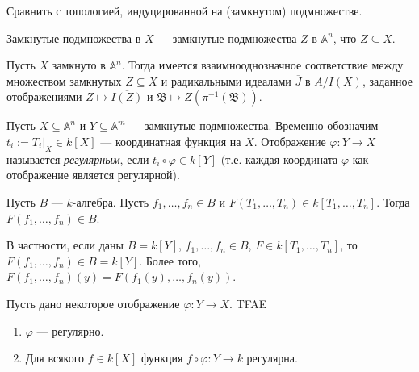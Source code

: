 \documentclass[12pt,a4paper]{article}
\renewcommand{\AA}{\ensuremath{\mathbb{A}}\xspace}
\begin{document}
    \begin{remark*}
        Сравнить с топологией, индуцированной на (замкнутом) подмножестве.
    \end{remark*}

    \begin{remark*}
        Замкнутые подмножества в $X$ --- замкнутые подмножества $Z$ в $\AA^n$, что $Z \subseteq X$.
    \end{remark*}

    \begin{corollary}
        Пусть $X$ замкнуто в $\AA^n$. Тогда имеется взаимнооднозначное соответствие между множеством замкнутых $Z \subseteq X$ и радикальными идеалами $\overline{J}$ в $A/I(X)$, заданное отображениями $Z \mapsto \overline{I(Z)}$ и $\mathfrak{B} \mapsto Z(\pi^{-1}(\mathfrak{B}))$.
    \end{corollary}

    \begin{definition}
        Пусть $X \subseteq \AA^n$ и $Y \subseteq \AA^m$ --- замкнутые подмножества. Временно обозначим $t_i := T_i|_X \in k[X]$ --- координатная функция на $X$. Отображение $\varphi: Y \to X$ называется \emph{регулярным}, если $t_i \circ \varphi \in k[Y]$ (т.е. каждая координата $\varphi$ как отображение является регулярной).
    \end{definition}

    \begin{remark}
        Пусть $B$ --- $k$-алгебра. Пусть $f_1, \dots, f_n \in B$ и $F(T_1, \dots, T_n) \in k[T_1, \dots, T_n]$. Тогда $F(f_1, \dots, f_n) \in B$.

        В частности, если даны $B = k[Y]$, $f_1, \dots, f_n \in B$, $F \in k[T_1, \dots, T_n]$, то $F(f_1, \dots, f_n) \in B = k[Y]$. Более того, $F(f_1, \dots, f_n)(y) = F(f_1(y), \dots, f_n(y))$.
    \end{remark}

    \begin{lemma}
        Пусть дано некоторое отображение $\varphi: Y \to X$. TFAE
        \begin{enumerate}
            \item $\varphi$ --- регулярно.
            \item Для всякого $f \in k[X]$ функция $f \circ \varphi: Y \to k$ регулярна.
        \end{enumerate}
    \end{lemma}
\end{document}
